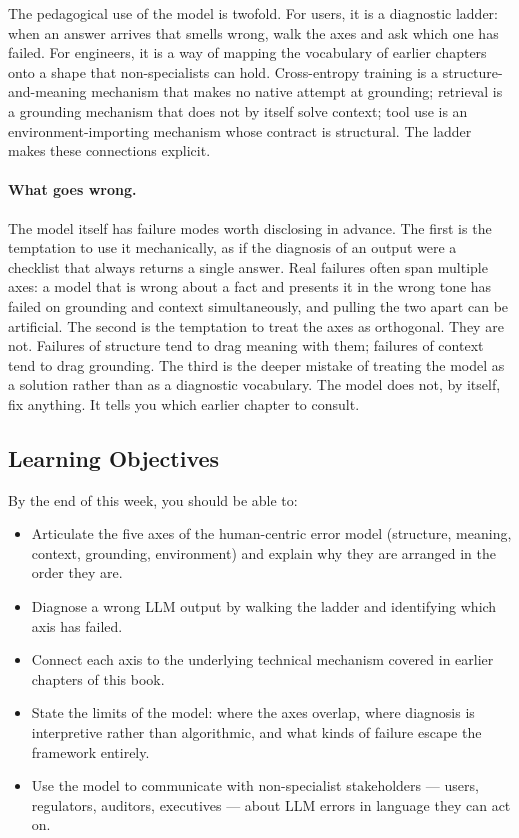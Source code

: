 The pedagogical use of the model is twofold. For users, it is a
diagnostic ladder: when an answer arrives that smells wrong, walk
the axes and ask which one has failed. For engineers, it is a way
of mapping the vocabulary of earlier chapters onto a shape that
non-specialists can hold. Cross-entropy training is a structure-
and-meaning mechanism that makes no native attempt at grounding;
retrieval is a grounding mechanism that does not by itself solve
context; tool use is an environment-importing mechanism whose
contract is structural. The ladder makes these connections
explicit.

\paragraph{What goes wrong.}
The model itself has failure modes worth disclosing in advance.
The first is the temptation to use it mechanically, as if the
diagnosis of an output were a checklist that always returns a
single answer. Real failures often span multiple axes: a model
that is wrong about a fact and presents it in the wrong tone has
failed on grounding and context simultaneously, and pulling the
two apart can be artificial. The second is the temptation to treat
the axes as orthogonal. They are not. Failures of structure tend to
drag meaning with them; failures of context tend to drag grounding.
The third is the deeper mistake of treating the model as a solution
rather than as a diagnostic vocabulary. The model does not, by
itself, fix anything. It tells you which earlier chapter to
consult.

\subsection{Learning Objectives}

By the end of this week, you should be able to:
\begin{itemize}
  \item Articulate the five axes of the human-centric error model
        (structure, meaning, context, grounding, environment) and
        explain why they are arranged in the order they are.
  \item Diagnose a wrong LLM output by walking the ladder and
        identifying which axis has failed.
  \item Connect each axis to the underlying technical mechanism
        covered in earlier chapters of this book.
  \item State the limits of the model: where the axes overlap,
        where diagnosis is interpretive rather than algorithmic,
        and what kinds of failure escape the framework entirely.
  \item Use the model to communicate with non-specialist
        stakeholders --- users, regulators, auditors, executives
        --- about LLM errors in language they can act on.
\end{itemize}

